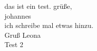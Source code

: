 \documentclass{article}
\begin{document}
das ist ein test. gr\"u{\ss}e,\\

johannes\\

ich schreibe mal etwas hinzu.\\

Gruß Leona\\


Test 2
\end{document}
